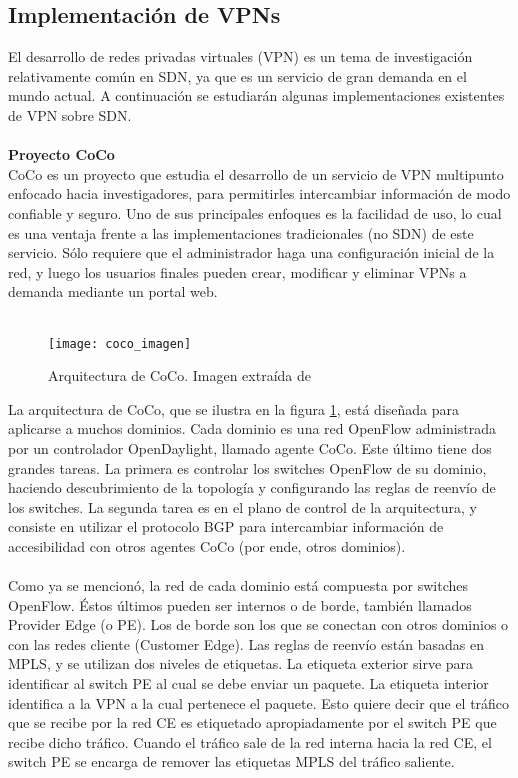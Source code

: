 \subsection{Implementación de VPNs}
El desarrollo de redes privadas virtuales (VPN) es un tema de investigación relativamente común en SDN, ya que es un servicio de gran demanda en el mundo actual. A continuación se estudiarán algunas implementaciones existentes de VPN sobre SDN. \\ \\
\textbf{Proyecto CoCo} \\
CoCo \cite{coco-paper} es un proyecto que estudia el desarrollo de un servicio de VPN multipunto enfocado hacia investigadores, para permitirles intercambiar información de modo confiable y seguro. Uno de sus principales enfoques es la facilidad de uso, lo cual es una ventaja frente a las implementaciones tradicionales (no SDN) de este servicio. Sólo requiere que el administrador haga una configuración inicial de la red, y luego los usuarios finales pueden crear, modificar y  eliminar VPNs a demanda mediante un portal web. \\ \\
\begin{figure}[t]
	\caption{Arquitectura de CoCo. Imagen extraída de \cite{coco-paper}}
	\texttt{[image: coco\_imagen]}
	\centering
	\label{fig:coco_imagen}
\end{figure}
La arquitectura de CoCo, que se ilustra en la figura \ref{fig:coco_imagen}, está diseñada para aplicarse a muchos dominios. Cada dominio es una red OpenFlow administrada por un controlador OpenDaylight, llamado agente CoCo. Este último tiene dos grandes tareas. La primera es controlar los switches OpenFlow de su dominio, haciendo descubrimiento de la topología y configurando las reglas de reenvío de los switches. La segunda tarea es en el plano de control de la arquitectura, y consiste en utilizar el protocolo BGP para intercambiar información de accesibilidad con otros agentes CoCo (por ende, otros dominios). \\ \\
Como ya se mencionó, la red de cada dominio está compuesta por switches OpenFlow. Éstos últimos pueden ser internos o de borde, también llamados Provider Edge (o PE). Los de borde son los que se conectan con otros dominios o con las redes cliente (Customer Edge). Las reglas de reenvío están basadas en MPLS, y se utilizan dos niveles de etiquetas. La etiqueta exterior sirve para identificar al switch PE al cual se debe enviar un paquete. La etiqueta interior identifica a la VPN a la cual pertenece el paquete. Esto quiere decir que el tráfico que se recibe por la red CE es etiquetado apropiadamente por el switch PE que recibe dicho tráfico. Cuando el tráfico sale de la red interna hacia la red CE, el switch PE se encarga de remover las etiquetas MPLS del tráfico saliente. \\ \\
